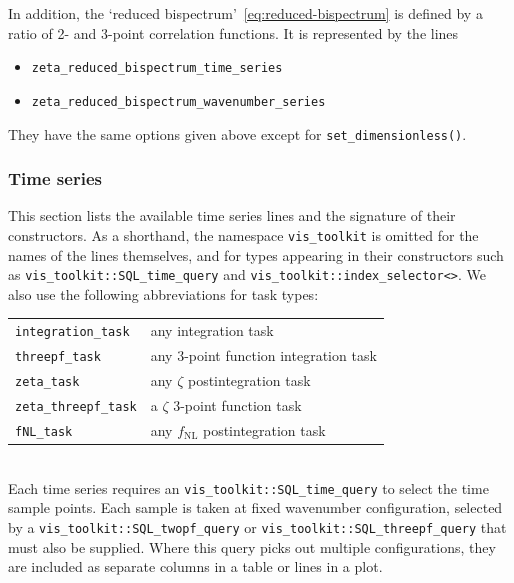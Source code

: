 \documentclass[11pt,a4paper]{article}
\newcommand{\fNL}{f_{\mathrm{NL}}}
\begin{document}
In addition, the `reduced bispectrum'~\eqref{eq:reduced-bispectrum}
is defined by a ratio of 2- and 3-point correlation functions.
It is represented by the lines
\begin{itemize}
    \item \texttt{zeta_reduced_bispectrum_time_series}
    \item \texttt{zeta_reduced_bispectrum_wavenumber_series}
\end{itemize}
They have the same options given above except for
\texttt{set_dimensionless()}.

\subsubsection{Time series}
\label{sec:time-series}
This section lists the available time series lines and the
signature of their constructors.
As a shorthand, the namespace
\texttt{vis_toolkit}
is omitted for the names of the lines themselves,
and for types appearing in their constructors
such as \texttt{vis_toolkit::SQL_time_query}
and
\texttt{vis_toolkit::index_selector<>}.
We also use the following abbreviations for task types: \\
\begin{tabular}{p{3.5cm}p{10.5cm}}
    \texttt{integration_task} & any integration task \\
    \texttt{threepf_task} & any 3-point function integration task \\
    \texttt{zeta_task} & any $\zeta$ postintegration task \\
    \texttt{zeta_threepf_task} & a $\zeta$ 3-point function task \\
    \texttt{fNL_task} & any $\fNL$ postintegration task    
\end{tabular} \\
Each time series requires an
\texttt{vis_toolkit::SQL_time_query} to select the
time sample points.
Each sample is taken at fixed wavenumber configuration,
selected by a
\texttt{vis_toolkit::SQL_twopf_query} or
\texttt{vis_toolkit::SQL_threepf_query}
that must also be supplied.
Where this query picks out multiple configurations, they are included
as separate columns in a table or lines in a plot.
 
\end{document}
